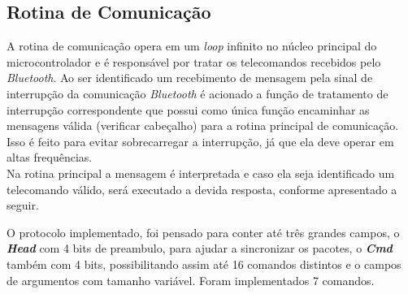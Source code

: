\subsection{Rotina de Comunicação}
\label{subsec:rotina_comunicacao}
A rotina de comunicação opera em um \emph{loop} infinito no núcleo principal do microcontrolador e é responsável por tratar os telecomandos recebidos pelo \textit{Bluetooth}. Ao ser identificado um recebimento de mensagem pela sinal de interrupção da comunicação \textit{Bluetooth} é acionado a função de tratamento de interrupção correspondente que possui como única função encaminhar as mensagens válida (verificar cabeçalho) para a rotina principal de comunicação. Isso é feito para evitar sobrecarregar a interrupção, já que ela deve operar em altas frequências.\\

Na rotina principal a mensagem é interpretada e caso ela seja identificado um telecomando válido, será executado a devida resposta, conforme apresentado a seguir.

O protocolo implementado, foi pensado para conter até três grandes campos, o \textbf{\textit{Head}} com 4 bits de preambulo, para ajudar a sincronizar os pacotes, o \textbf{\textit{Cmd}} também com 4 bits, possibilitando assim até 16 comandos distintos e o campos de argumentos com tamanho variável. Foram implementados 7 comandos. 


    
